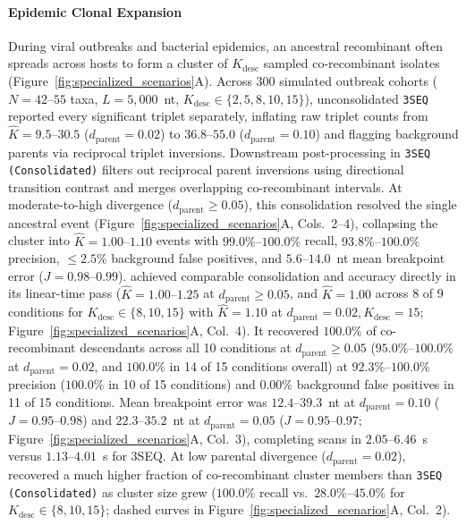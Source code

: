\paragraph{Epidemic Clonal Expansion}
During viral outbreaks and bacterial epidemics, an ancestral recombinant often spreads across hosts to form a cluster of $K_{\mathrm{desc}}$ sampled co-recombinant isolates (Figure~\ref{fig:specialized_scenarios}A). Across 300 simulated outbreak cohorts ($N = 42\text{--}55$ taxa, $L = 5{,}000$~nt, $K_{\mathrm{desc}} \in \{2, 5, 8, 10, 15\}$), unconsolidated \texttt{3SEQ} reported every significant triplet separately, inflating raw triplet counts from $\hat{K} = 9.5\text{--}30.5$ ($d_{\mathrm{parent}} = 0.02$) to $36.8\text{--}55.0$ ($d_{\mathrm{parent}} = 0.10$) and flagging background parents via reciprocal triplet inversions. Downstream post-processing in \texttt{3SEQ (Consolidated)} filters out reciprocal parent inversions using directional transition contrast and merges overlapping co-recombinant intervals. At moderate-to-high divergence ($d_{\mathrm{parent}} \ge 0.05$), this consolidation resolved the single ancestral event (Figure~\ref{fig:specialized_scenarios}A, Cols.~2--4), collapsing the cluster into $\hat{K} = 1.00\text{--}1.10$ events with $99.0\%\text{--}100.0\%$ recall, $93.8\%\text{--}100.0\%$ precision, $\le 2.5\%$ background false positives, and $5.6\text{--}14.0$~nt mean breakpoint error ($J = 0.98\text{--}0.99$). \RhizAeon achieved comparable consolidation and accuracy directly in its linear-time pass ($\hat{K} = 1.00\text{--}1.25$ at $d_{\mathrm{parent}} \ge 0.05$, and $\hat{K} = 1.00$ across 8 of 9 conditions for $K_{\mathrm{desc}} \in \{8, 10, 15\}$ with $\hat{K} = 1.10$ at $d_{\mathrm{parent}} = 0.02, K_{\mathrm{desc}} = 15$; Figure~\ref{fig:specialized_scenarios}A, Col.~4). It recovered $100.0\%$ of co-recombinant descendants across all 10 conditions at $d_{\mathrm{parent}} \ge 0.05$ ($95.0\%\text{--}100.0\%$ at $d_{\mathrm{parent}} = 0.02$, and $100.0\%$ in 14 of 15 conditions overall) at $92.3\%\text{--}100.0\%$ precision ($100.0\%$ in 10 of 15 conditions) and $0.00\%$ background false positives in 11 of 15 conditions. Mean breakpoint error was $12.4\text{--}39.3$~nt at $d_{\mathrm{parent}} = 0.10$ ($J = 0.95\text{--}0.98$) and $22.3\text{--}35.2$~nt at $d_{\mathrm{parent}} = 0.05$ ($J = 0.95\text{--}0.97$; Figure~\ref{fig:specialized_scenarios}A, Col.~3), completing scans in $2.05\text{--}6.46$~s versus $1.13\text{--}4.01$~s for 3SEQ. At low parental divergence ($d_{\mathrm{parent}} = 0.02$), \RhizAeon recovered a much higher fraction of co-recombinant cluster members than \texttt{3SEQ (Consolidated)} as cluster size grew ($100.0\%$ recall vs.\ $28.0\%\text{--}45.0\%$ for $K_{\mathrm{desc}} \in \{8, 10, 15\}$; dashed curves in Figure~\ref{fig:specialized_scenarios}A, Col.~2).

